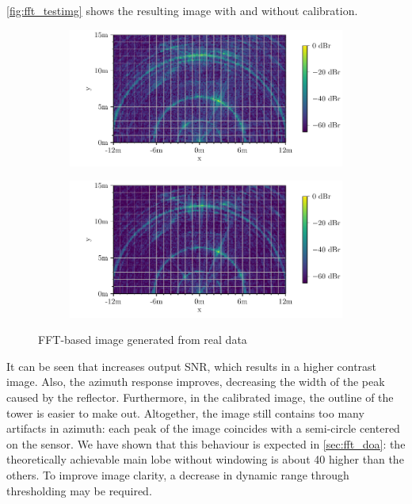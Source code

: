 \autoref{fig:fft_testimg} shows the resulting image with and without calibration.
\begin{figure}
    \centering
    \begin{subfigure}{0.8\textwidth}
        \includegraphics[width=\textwidth]{../figures/testimg_uncalibrated_fft.pdf}
    \end{subfigure}
    \begin{subfigure}{0.8\textwidth}
        \includegraphics[width=\textwidth]{../figures/testimg_calibrated_fft.pdf}
    \end{subfigure}
    \caption{FFT-based image generated from real data}
    \label{fig:fft_testimg}
\end{figure}
It can be seen that increases output SNR, which results in a higher contrast image.
Also, the azimuth response improves, decreasing the width of the peak caused by the reflector.
Furthermore, in the calibrated image, the outline of the tower is easier to make out.
Altogether, the image still contains too many artifacts in azimuth:
each peak of the image coincides with a semi-circle centered on the sensor.
We have shown that this behaviour is expected in \autoref{sec:fft_doa}: 
the theoretically achievable main lobe without windowing is about \SI{40}{\db} higher than the others.
To improve image clarity, a decrease in dynamic range through thresholding may be required.

